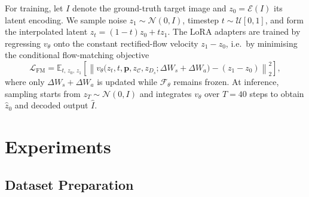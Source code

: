 \documentclass[runningheads]{llncs}
\begin{document}
For training, let $I$ denote the ground-truth target image and $z_0 = \mathcal{E}(I)$ its latent encoding. We sample noise $z_1 \sim \mathcal{N}(0, I)$, timestep $t \sim \mathcal{U}[0, 1]$, and form the interpolated latent $z_t = (1 - t) z_0 + t z_1$. The LoRA adapters are trained by regressing $v_\theta$ onto the constant rectified-flow velocity $z_1 - z_0$, i.e.\ by minimising the conditional flow-matching objective
\begin{equation}
  \mathcal{L}_{\text{FM}} = \mathbb{E}_{t,\, z_0,\, z_1} \left[ \left\lVert v_\theta\bigl(z_t, t, \mathbf{p}, z_{\mathcal{C}}, z_{D_s}; \Delta W_s + \Delta W_a\bigr) - (z_1 - z_0) \right\rVert_2^2 \right],
\end{equation}
where only $\Delta W_s + \Delta W_a$ is updated while $\mathcal{F}_\theta$ remains frozen. At inference, sampling starts from $z_T \sim \mathcal{N}(0, I)$ and integrates $v_\theta$ over $T{=}40$ steps to obtain $\hat{z}_0$ and decoded output $\hat{I}$.

\section{Experiments}

\subsection{Dataset Preparation}
\label{sec:dataset-prep}
\end{document}
